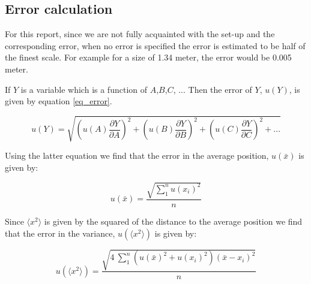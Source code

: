 \subsection{Error calculation}

For this report, since we are not fully acquainted with the set-up and the corresponding error, when no error is specified the error is estimated to be half of the finest scale. For example for a size of 1.34 meter, the error would be 0.005 meter.

If $Y$ is a variable which is a function of $A$,$B$,$C$, ... Then the error of $Y$, $u(Y)$, is given by equation \ref{eq_error}.

\begin{equation}
	\label{eq_error}
	u(Y) = \sqrt{\left(u(A) \frac{\partial Y}{\partial A}\right)^2 + \left(u(B) \frac{\partial Y}{\partial B}\right)^2 + \left(u(C) \frac{\partial Y}{\partial C}\right)^2 + ...}
\end{equation}

Using the latter equation we find that the error in the average position, $u(\bar{x})$ is given by:

\begin{equation}
	u(\bar{x}) =  \frac{ \sqrt{ \sum_1^n u(x_i)^2}}{n} 
\end{equation}

Since $ \langle x^2 \rangle $ is given by the squared of the distance to the average position we find that the error in the variance, $u( \langle x^2 \rangle ) $ is given by:

\begin{equation}
	u( \langle x^2 \rangle ) =  \frac{ \sqrt{ 4 \: \sum_1^n    \left( u(\bar{x})^2 + u(x_i)^2 \right) \left( \bar{x} - x_i \right)^2}}{n}
\end{equation}





